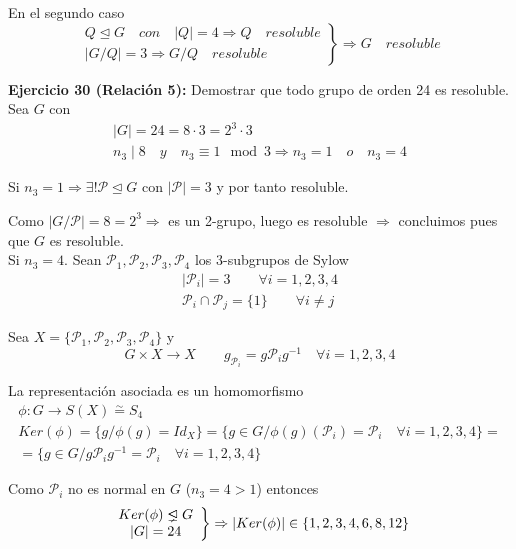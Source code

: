 \documentclass{article}
\newcommand{\unlhdneq}{%
  \mathrel{\ooalign{$\lneq$\cr\raise.22ex\hbox{$\lhd$}\cr}}}
\begin{document}
En el segundo caso
\begin{equation*}
\left.\begin{array}{c}
Q\unlhd G\quad con\quad |Q|=4\Rightarrow Q\quad resoluble\\
|G/Q|=3\Rightarrow G/Q\quad resoluble
\end{array} \right\rbrace \Rightarrow G\quad resoluble
\end{equation*}

\textbf{Ejercicio 30 (Relación 5):} Demostrar que todo grupo de orden 24 es resoluble. Sea $G$ con
\begin{gather*}
|G|=24=8\cdot 3=2^3\cdot 3 \\
n_3\mid 8 \quad y\quad n_3\equiv 1\mod{3}\Rightarrow n_3=1\quad o\quad n_3=4
\end{gather*}

Si $n_3=1\Rightarrow \exists!\mathcal{P}\unlhd G$ con $|\mathcal{P}|=3$ y por tanto resoluble. 

Como $|G/\mathcal{P}|=8=2^3\Rightarrow$ es un 2-grupo, luego es resoluble $\Rightarrow$ concluimos pues que $G$ es resoluble. \\

Si $n_3=4$. Sean $\mathcal{P}_1,\mathcal{P}_2,\mathcal{P}_3,\mathcal{P}_4$ los 3-subgrupos de Sylow
\begin{equation*}
\left.\begin{array}{c}
|\mathcal{P}_i|=3\qquad \forall i=1,2,3,4\\
\mathcal{P}_i\cap \mathcal{P}_j=\{1\}\qquad \forall i\neq j
\end{array} \right.
\end{equation*}

Sea $X=\{\mathcal{P}_1,\mathcal{P}_2,\mathcal{P}_3,\mathcal{P}_4\}$ y 
\begin{equation*}
G\times X\longrightarrow X\qquad g_{\mathcal{P}_i}=g\mathcal{P}_ig^{-1}\quad \forall i=1,2,3,4
\end{equation*}

La representación asociada es un homomorfismo
\begin{gather*}
\phi:G\longrightarrow S(X)\overset{\sim}{=} S_4 \\
Ker(\phi)=\{g/\phi(g)=Id_X\}=\{g\in G/\phi(g)(\mathcal{P}_i)=\mathcal{P}_i\quad \forall i=1,2,3,4\}=\\
=\{g\in G/g\mathcal{P}_ig^{-1}=\mathcal{P}_i\quad \forall i=1,2,3,4\}
\end{gather*}

Como $\mathcal{P}_i$ no es normal en $G$ ($n_3=4>1$) entonces 
\begin{equation*}
\left.\begin{array}{c}
Ker(\phi)\unlhdneq G\\
|G|=24
\end{array} \right\rbrace \Rightarrow |Ker(\phi)|\in\{1,2,3,4,6,8,12\}
\end{equation*}
\end{document}
